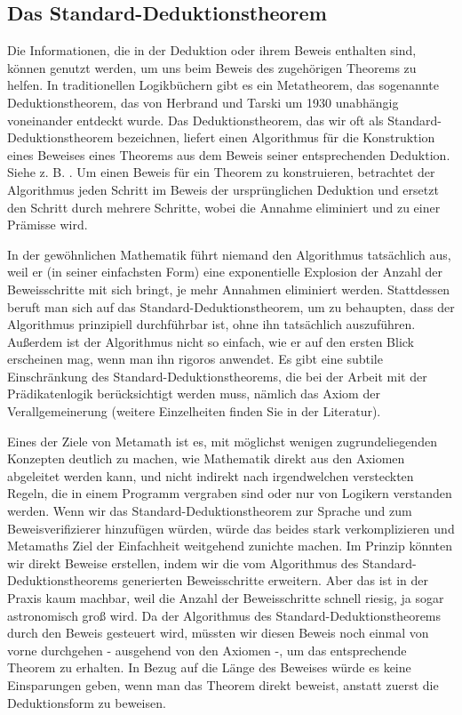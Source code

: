 \subsection{Das Standard-Deduktionstheorem}\label{standarddeductiontheorem}

Die Informationen, die in der Deduktion oder ihrem Beweis enthalten sind, können genutzt werden, um uns beim Beweis des zugehörigen Theorems zu helfen. In traditionellen Logikbüchern gibt es ein Metatheorem, das sogenannte Deduktionstheorem, das von Herbrand und Tarski um 1930 unabhängig voneinander entdeckt wurde. Das Deduktionstheorem, das wir oft als Standard-Deduktionstheorem bezeichnen, liefert einen Algorithmus für die Konstruktion eines Beweises eines Theorems aus dem Beweis seiner entsprechenden Deduktion. Siehe z. B. \cite[S.~56]{Margaris}. Um einen Beweis für ein Theorem zu konstruieren, betrachtet der Algorithmus jeden Schritt im Beweis der ursprünglichen Deduktion und ersetzt den Schritt durch mehrere Schritte, wobei die Annahme eliminiert und zu einer Prämisse wird.

In der gewöhnlichen Mathematik führt niemand den Algorithmus tatsächlich aus, weil er (in seiner einfachsten Form) eine exponentielle Explosion der Anzahl der Beweisschritte mit sich bringt, je mehr Annahmen eliminiert werden. Stattdessen beruft man sich auf das Standard-Deduktionstheorem, um zu behaupten, dass der Algorithmus prinzipiell durchführbar ist, ohne ihn tatsächlich auszuführen. Außerdem ist der Algorithmus nicht so einfach, wie er auf den ersten Blick erscheinen mag, wenn man ihn rigoros anwendet. Es gibt eine subtile Einschränkung des Standard-Deduktionstheorems, die bei der Arbeit mit der Prädikatenlogik berücksichtigt werden muss, nämlich das Axiom der Verallgemeinerung (weitere Einzelheiten finden Sie in der Literatur).

Eines der Ziele von Metamath ist es, mit möglichst wenigen zugrundeliegenden Konzepten deutlich zu machen, wie Mathematik direkt aus den Axiomen abgeleitet werden kann, und nicht indirekt nach irgendwelchen versteckten Regeln, die in einem Programm vergraben sind oder nur von Logikern verstanden werden. Wenn wir das Standard-Deduktionstheorem zur Sprache und zum Beweisverifizierer hinzufügen würden, würde das beides stark verkomplizieren und Metamaths Ziel der Einfachheit weitgehend zunichte machen. Im Prinzip könnten wir direkt Beweise erstellen, indem wir die vom Algorithmus des Standard-Deduktionstheorems generierten Beweisschritte erweitern.  Aber das ist in der Praxis kaum machbar, weil die Anzahl der Beweisschritte schnell riesig, ja sogar astronomisch groß wird. Da der Algorithmus des Standard-Deduktionstheorems durch den Beweis gesteuert wird, müssten wir diesen Beweis noch einmal von vorne durchgehen - ausgehend von den Axiomen -, um das entsprechende Theorem zu erhalten. In Bezug auf die Länge des Beweises würde es keine Einsparungen geben, wenn man das Theorem direkt beweist, anstatt zuerst die Deduktionsform zu beweisen.

